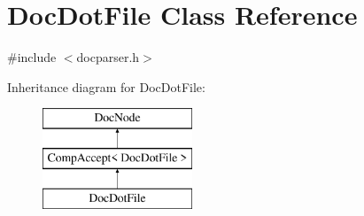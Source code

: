\hypertarget{class_doc_dot_file}{}\section{Doc\+Dot\+File Class Reference}
\label{class_doc_dot_file}


{\ttfamily \#include $<$docparser.\+h$>$}

Inheritance diagram for Doc\+Dot\+File\+:\begin{figure}[H]
\begin{center}
\leavevmode
\includegraphics[height=3.000000cm]{class_doc_dot_file}
\end{center}
\end{figure}
